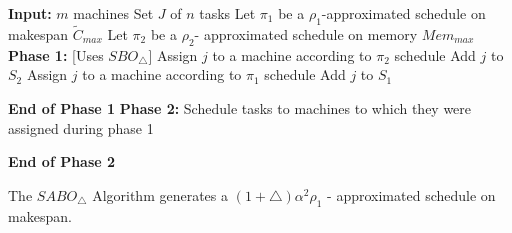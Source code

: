 \documentclass[twocolumn]{svjour3}
\begin{document}
\begin{algorithm}                    
  \caption{$SABO_\triangle$}
  \label{alg2}
  \begin{algorithmic} 
    \State \textbf{Input:} $m$ machines 
    \State \hspace*{15pt}Set $J$ of $n$ tasks
    \State\hspace*{15pt}Let $\pi_1$ be a $ \rho_1$-approximated schedule on makespan $\tilde{C}_{max}$ 
    \State \hspace*{15pt}Let $\pi_2$ be a $\rho_2$- approximated schedule on memory ${Mem_{max}}$
    \State
    \State \textbf{Phase 1:} [Uses $SBO_\triangle$]
    \State Assign $j$ to a machine according to $\pi_2$ schedule
    \State Add $j$ to $S_2$
    \Else
    \State Assign $j$ to a machine according to $\pi_1$ schedule
    \State Add $j$ to $S_1$   
    \EndIf 
    \EndFor
    
    \State \textbf{End of Phase 1} 
    \State 
    \State \textbf{Phase 2:} 
    \State \hspace*{42pt}Schedule tasks to machines to which they were assigned during phase 1
    
    \State \textbf{End of Phase 2} 
    
  \end{algorithmic}
\end{algorithm}     



\begin{theorem}
  \label{th:chapter5-2a}
  The $SABO_\triangle$ Algorithm generates a $(1+\triangle)\alpha^2
  \rho_1$ - approximated schedule on makespan.
\end{theorem}         
\end{document}

